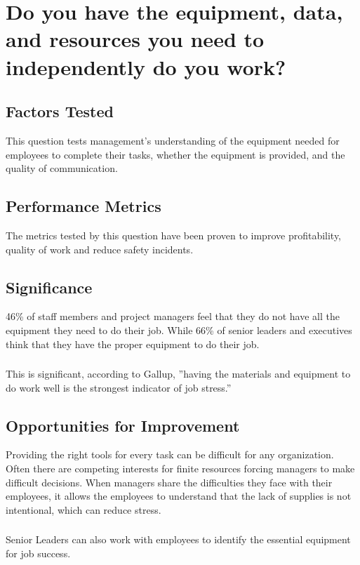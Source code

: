 \documentclass[14pt]{extreport}
\begin{document}
\newpage
\section*{Do you have the equipment, data, and resources you need to independently do you work?}

\subsection*{\centering Factors Tested}
This question tests management's understanding of the equipment
needed for employees to complete their tasks, whether the
equipment is provided, and the quality of communication.
\subsection*{\centering Performance Metrics}
The metrics tested by this question have been proven to improve
profitability, quality of work and reduce safety incidents.

\subsection*{\centering Significance}
46\% of staff members and project managers feel that they do not have all the equipment they need to do their job. While 66\% of senior leaders and executives think that they have the proper equipment to do their job.
\subsubsection*{}
This is significant, according to Gallup, ”having the materials and
equipment to do work well is the strongest indicator of job stress.”

\subsection*{\centering Opportunities for Improvement}
Providing the right tools for every task can be difficult for any organization. Often there are competing interests for finite resources forcing managers to make difficult decisions. When managers share the difficulties they face with their employees, it allows the employees to understand that the lack of supplies is not intentional, which can reduce stress.
\subsubsection*{}
Senior Leaders can also work with employees to identify the essential equipment for job success. 
\end{document}
